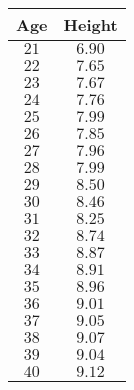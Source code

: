 \begin{tabular}{cc} \toprule
Age  & Height \\\midrule
$21$ & $6.90$ \\
$22$ & $7.65$ \\
$23$ & $7.67$ \\
$24$ & $7.76$ \\
$25$ & $7.99$ \\
$26$ & $7.85$ \\
$27$ & $7.96$ \\
$28$ & $7.99$ \\
$29$ & $8.50$ \\
$30$ & $8.46$ \\
$31$ & $8.25$ \\
$32$ & $8.74$ \\
$33$ & $8.87$ \\
$34$ & $8.91$ \\
$35$ & $8.96$ \\
$36$ & $9.01$ \\
$37$ & $9.05$ \\
$38$ & $9.07$ \\
$39$ & $9.04$ \\
$40$ & $9.12$ \\\bottomrule
\end{tabular}
